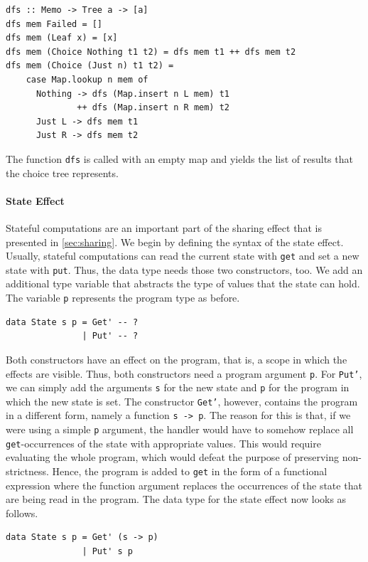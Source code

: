 \documentclass[a4paper, 11pt, fleqn, twoside, abstract=on]{scrreprt}
\newcommand{\todo}[1]{\marginpar{\textbf{TODO:} #1}}
\newcommand{\hinl}[1]{\texttt{#1}}
\begin{document}
\begin{verbatim}
dfs :: Memo -> Tree a -> [a]
dfs mem Failed = []
dfs mem (Leaf x) = [x]
dfs mem (Choice Nothing t1 t2) = dfs mem t1 ++ dfs mem t2
dfs mem (Choice (Just n) t1 t2) =
    case Map.lookup n mem of
      Nothing -> dfs (Map.insert n L mem) t1 
              ++ dfs (Map.insert n R mem) t2
      Just L -> dfs mem t1
      Just R -> dfs mem t2
\end{verbatim}

The function \hinl{dfs} is called with an empty map and yields the list of results that the choice tree represents.
\todo{Examples}

\paragraph{State Effect}
Stateful computations are an important part of the sharing effect that is presented in \autoref{sec:sharing}.
We begin by defining the syntax of the state effect.
Usually, stateful computations can read the current state with \hinl{get} and set a new state with \hinl{put}.
Thus, the data type needs those two constructors, too.
We add an additional type variable that abstracts the type of values that the state can hold.
The variable \hinl{p} represents the program type as before.

\begin{verbatim}
data State s p = Get' -- ?
               | Put' -- ?
\end{verbatim}

Both constructors have an effect on the program, that is, a scope in which the effects are visible.
Thus, both constructors need a program argument \hinl{p}.
For \hinl{Put'}, we can simply add the arguments \hinl{s} for the new state and \hinl{p} for the program in which the new state is set.
The constructor \hinl{Get'}, however, contains the program in a different form, namely a function \hinl{s -> p}.
The reason for this is that, if we were using a simple \hinl{p} argument, the handler would have to somehow replace all \hinl{get}-occurrences of the state with appropriate values.
This would require evaluating the whole program, which would defeat the purpose of preserving non-strictness.
Hence, the program is added to \hinl{get} in the form of a functional expression where the function argument replaces the occurrences of the state that are being read in the program.
The data type for the state effect now looks as follows.

\begin{verbatim}
data State s p = Get' (s -> p)
               | Put' s p
\end{verbatim}
\end{document}
